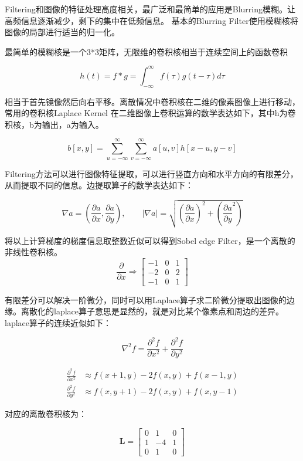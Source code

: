 \documentclass{ctexart}
\theoremstyle{cnthm}
\begin{document}
Filtering和图像的特征处理高度相关，最广泛和最简单的应用是Blurring模糊。让高频信息逐渐减少，剩下的集中在低频信息。
基本的Blurring Filter使用模糊核将图像的局部进行适当的归一化。

最简单的模糊核是一个3*3矩阵，无限维的卷积核相当于连续空间上的函数卷积

\[
h(t) = f * g = \int_{-\infty}^{\infty} f(\tau)g(t - \tau) d\tau
\]

相当于首先镜像然后向右平移。离散情况中卷积核在二维的像素图像上进行移动，常用的卷积核Laplace Kernel
在二维图像上卷积运算的数学表达如下，其中h为卷积核，b为输出，a为输入。

\[
b[x, y] = \sum_{u = -\infty}^{\infty}\sum_{v = -\infty}^{\infty}a[u,v]h[x - u,y - v]  
\]

Filtering方法可以进行图像特征提取，可以进行竖直方向和水平方向的有限差分，从而提取不同的信息。边提取算子的数学表达如下：

\[
\nabla a  = (\frac{\partial a}{\partial x}, \frac{\partial a}{\partial y}) , \qquad |\nabla a| = \sqrt{(\frac{\partial a}{\partial x})^2 + (\frac{\partial a}{\partial y}^2)}
\]

将以上计算梯度的梯度信息取整数近似可以得到Sobel edge Filter，是一个离散的非线性卷积核。
\[
\frac{\partial}{\partial x} \Rightarrow
\begin{bmatrix}
    -1 & 0 & 1 \\
    -2 & 0 & 2 \\
    -1 & 0 & 1
\end{bmatrix}
\]

有限差分可以解决一阶微分，同时可以用Laplace算子求二阶微分提取出图像的边缘。离散化的laplace算子意思是显然的，就是对比某个像素点和周边的差异。
laplace算子的连续近似如下：

\[
\nabla^2 f = \frac{\partial^2 f}{\partial x^2} + \frac{\partial^2 f}{\partial y^2}
\]

\[
\begin{aligned}
\frac{\partial^2 f}{\partial x^2} &\approx f(x+1, y) - 2f(x, y) + f(x-1, y) \\
\frac{\partial^2 f}{\partial y^2} &\approx f(x, y+1) - 2f(x, y) + f(x, y-1)
\end{aligned}
\]

对应的离散卷积核为：

\[
\mathbf{L} = \begin{bmatrix}
    0 & 1 & 0 \\
    1 & -4 & 1 \\
    0 & 1 & 0
\end{bmatrix}
\]
\end{document}
